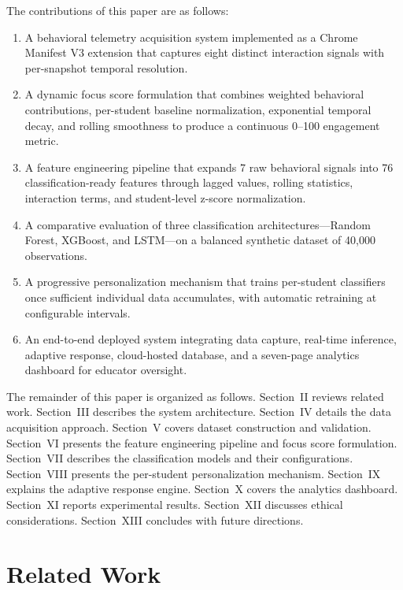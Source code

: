 \documentclass[conference]{IEEEtran}
\begin{document}
The contributions of this paper are as follows:
\begin{enumerate}[leftmargin=*]
    \item A behavioral telemetry acquisition system implemented as a Chrome Manifest V3 extension that captures eight distinct interaction signals with per-snapshot temporal resolution.
    \item A dynamic focus score formulation that combines weighted behavioral contributions, per-student baseline normalization, exponential temporal decay, and rolling smoothness to produce a continuous 0--100 engagement metric.
    \item A feature engineering pipeline that expands 7 raw behavioral signals into 76 classification-ready features through lagged values, rolling statistics, interaction terms, and student-level z-score normalization.
    \item A comparative evaluation of three classification architectures---Random Forest, XGBoost, and LSTM---on a balanced synthetic dataset of 40,000 observations.
    \item A progressive personalization mechanism that trains per-student classifiers once sufficient individual data accumulates, with automatic retraining at configurable intervals.
    \item An end-to-end deployed system integrating data capture, real-time inference, adaptive response, cloud-hosted database, and a seven-page analytics dashboard for educator oversight.
\end{enumerate}

The remainder of this paper is organized as follows. Section~II reviews related work. Section~III describes the system architecture. Section~IV details the data acquisition approach. Section~V covers dataset construction and validation. Section~VI presents the feature engineering pipeline and focus score formulation. Section~VII describes the classification models and their configurations. Section~VIII presents the per-student personalization mechanism. Section~IX explains the adaptive response engine. Section~X covers the analytics dashboard. Section~XI reports experimental results. Section~XII discusses ethical considerations. Section~XIII concludes with future directions.

\section{Related Work}
\end{document}
